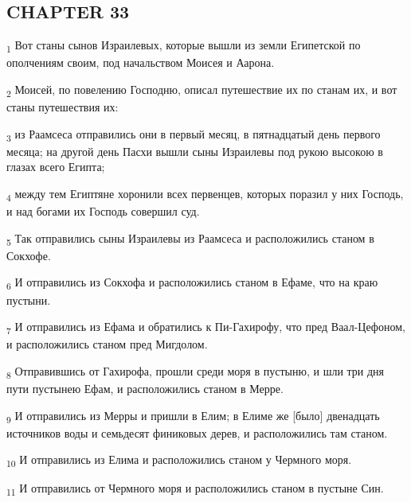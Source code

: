 \subsection{CHAPTER 33}
\begin{tcolorbox}
\textsubscript{1} Вот станы сынов Израилевых, которые вышли из земли Египетской по ополчениям своим, под начальством Моисея и Аарона.
\end{tcolorbox}
\begin{tcolorbox}
\textsubscript{2} Моисей, по повелению Господню, описал путешествие их по станам их, и вот станы путешествия их:
\end{tcolorbox}
\begin{tcolorbox}
\textsubscript{3} из Раамсеса отправились они в первый месяц, в пятнадцатый день первого месяца; на другой день Пасхи вышли сыны Израилевы под рукою высокою в глазах всего Египта;
\end{tcolorbox}
\begin{tcolorbox}
\textsubscript{4} между тем Египтяне хоронили всех первенцев, которых поразил у них Господь, и над богами их Господь совершил суд.
\end{tcolorbox}
\begin{tcolorbox}
\textsubscript{5} Так отправились сыны Израилевы из Раамсеса и расположились станом в Сокхофе.
\end{tcolorbox}
\begin{tcolorbox}
\textsubscript{6} И отправились из Сокхофа и расположились станом в Ефаме, что на краю пустыни.
\end{tcolorbox}
\begin{tcolorbox}
\textsubscript{7} И отправились из Ефама и обратились к Пи-Гахирофу, что пред Ваал-Цефоном, и расположились станом пред Мигдолом.
\end{tcolorbox}
\begin{tcolorbox}
\textsubscript{8} Отправившись от Гахирофа, прошли среди моря в пустыню, и шли три дня пути пустынею Ефам, и расположились станом в Мерре.
\end{tcolorbox}
\begin{tcolorbox}
\textsubscript{9} И отправились из Мерры и пришли в Елим; в Елиме же [было] двенадцать источников воды и семьдесят финиковых дерев, и расположились там станом.
\end{tcolorbox}
\begin{tcolorbox}
\textsubscript{10} И отправились из Елима и расположились станом у Чермного моря.
\end{tcolorbox}
\begin{tcolorbox}
\textsubscript{11} И отправились от Чермного моря и расположились станом в пустыне Син.
\end{tcolorbox}
